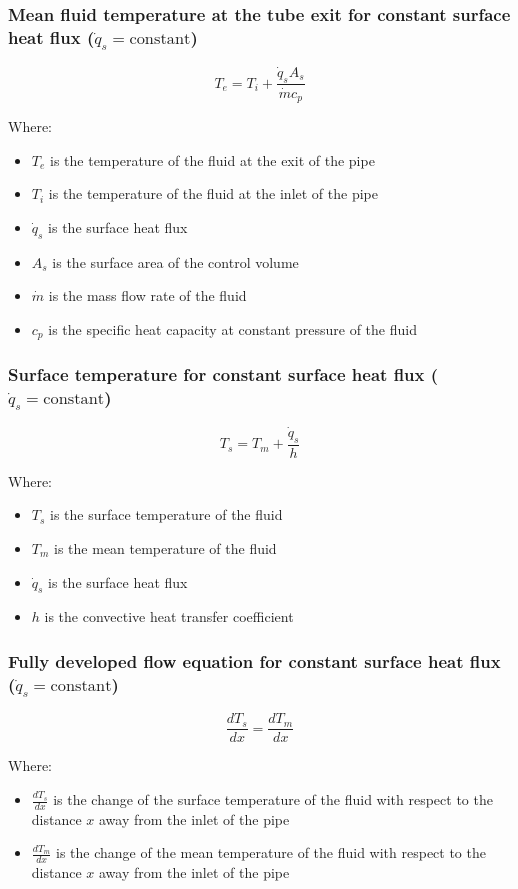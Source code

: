 \documentclass[11pt]{article}
\begin{document}
\subsubsection{Mean fluid temperature at the tube exit for constant surface heat flux (\(\dot{q}_s = \text{constant}\))}
\label{sec:orgc7cc94a}
\[T_e = T_i + \frac{\dot{q}_s A_s}{\dot{m} c_p}\]

Where:
\begin{itemize}
\item \(T_e\) is the temperature of the fluid at the exit of the pipe
\item \(T_i\) is the temperature of the fluid at the inlet of the pipe
\item \(\dot{q}_s\) is the surface heat flux
\item \(A_s\) is the surface area of the control volume
\item \(\dot{m}\) is the mass flow rate of the fluid
\item \(c_p\) is the specific heat capacity at constant pressure of the fluid
\end{itemize}

 \newpage
\subsubsection{Surface temperature for constant surface heat flux (\(\dot{q}_s = \text{constant}\))}
\label{sec:org5780b6f}
\[T_s = T_m + \frac{\dot{q}_s}{h}\]

Where:
\begin{itemize}
\item \(T_s\) is the surface temperature of the fluid
\item \(T_m\) is the mean temperature of the fluid
\item \(\dot{q}_s\) is the surface heat flux
\item \(h\) is the convective heat transfer coefficient
\end{itemize}
\subsubsection{Fully developed flow equation for constant surface heat flux (\(\dot{q}_s = \text{constant}\))}
\label{sec:org5553457}
\[\frac{dT_s}{dx} = \frac{dT_m}{dx}\]

Where:
\begin{itemize}
\item \(\frac{dT_s}{dx}\) is the change of the surface temperature of the fluid with respect to the distance \(x\) away from the inlet of the pipe
\item \(\frac{dT_m}{dx}\) is the change of the mean temperature of the fluid with respect to the distance \(x\) away from the inlet of the pipe
\end{itemize}
\end{document}
